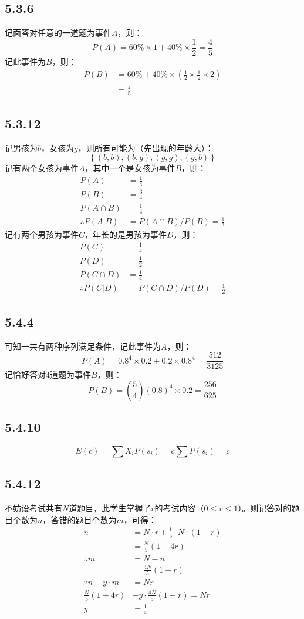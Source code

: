 \documentclass[twocolumn]{article}
\begin{document}
	\subsection*{5.3.6}
	记面答对任意的一道题为事件$A$，则：
	\[
	P(A)=60\%\times 1+40\%\times \frac{1}{2}=\frac{4}{5}
	\]
	记此事件为$B$，则：
	\[
	\begin{aligned}
		P(B)&=60\%+40\%\times\left(\frac{1}{2}\times\frac{1}{2}\times 2\right)\\
		&=\frac{4}{5}
	\end{aligned}
	\]
	\subsection*{5.3.12}
	记男孩为$b$，女孩为$g$，则所有可能为（先出现的年龄大）：
	\[
	\left\{(b,b),(b,g),(g,g),(g,b)\right\}
	\]
	记有两个女孩为事件$A$，其中一个是女孩为事件$B$，则：
	\[
	\begin{aligned}
		P(A)&=\frac{1}{4}\\
		P(B)&=\frac{3}{4}\\
		P(A\cap B)&=\frac{1}{4}\\
		\therefore P(A|B)&=P(A\cap B)/P(B)=\frac{1}{3}
	\end{aligned}
	\]
	记有两个男孩为事件$C$，年长的是男孩为事件$D$，则：
	\[
	\begin{aligned}
		P(C)&=\frac{1}{4}\\
		P(D)&=\frac{1}{2}\\
		P(C\cap D)&=\frac{1}{4}\\
		\therefore P(C|D)&=P(C\cap D)/P(D)=\frac{1}{2}
	\end{aligned}
	\]
	\subsection*{5.4.4}
	可知一共有两种序列满足条件，记此事件为$A$，则：
	\[
		P(A)=0.8^4\times 0.2+0.2\times 0.8^4=\frac{512}{3125}
	\]
	记恰好答对4道题为事件$B$，则：
	\[
		P(B)=\binom{5}{4}(0.8)^4\times 0.2=\frac{256}{625}
	\]
	\subsection*{5.4.10}
	\[
		E(c)=\sum X_iP(s_i)=c\sum P(s_i)=c
 	\]
 	\subsection*{5.4.12}
 	不妨设考试共有$N$道题目，此学生掌握了$r$的考试内容（$0\le r\le 1$）。则记答对的题目个数为$n$，答错的题目个数为$m$，可得：
 	\[
 	\begin{aligned}
 		n&=N\cdot r+\frac{1}{5}\cdot N\cdot\left(1-r\right)\\
 		&=\frac{N}{5}\left(1+4r\right)\\
 		\therefore m&=N-n\\
 		&=\frac{4N}{5}\left(1-r\right)\\
 		\because n-y\cdot m &=Nr\\
 		\frac{N}{5}\left(1+4r\right)&-y\cdot \frac{4N}{5}\left(1-r\right)=Nr\\
 		y&=\frac{1}{4}
 	\end{aligned}
 	\]
\end{document}
